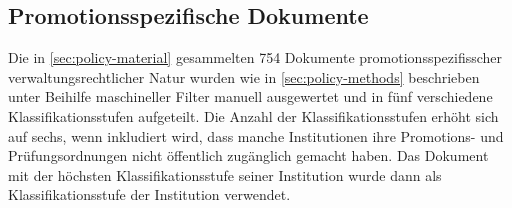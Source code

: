 


\subsection{Promotionsspezifische Dokumente}\label{sec:policy-results-specific}
Die in \cref{sec:policy-material} gesammelten \num{754} Dokumente promotionsspezifisscher verwaltungsrechtlicher Natur wurden wie in \cref{sec:policy-methods} beschrieben unter Beihilfe maschineller Filter manuell ausgewertet und in fünf verschiedene Klassifikationsstufen aufgeteilt.
Die Anzahl der Klassifikationsstufen erhöht sich auf sechs, wenn inkludiert wird, dass manche Institutionen ihre Promotions- und Prüfungsordnungen nicht öffentlich zugänglich gemacht haben.
Das Dokument mit der höchsten Klassifikationsstufe seiner Institution wurde dann als Klassifikationsstufe der Institution verwendet.

